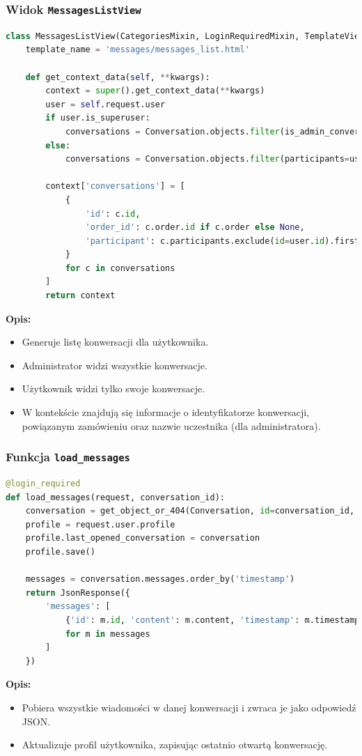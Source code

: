 \documentclass[12pt,a4paper,oneside]{article}
\theoremstyle{definition}
\numberwithin{equation}{section}
\begin{document}
\subsubsection{Widok \texttt{MessagesListView}}
\begin{lstlisting}[language=Python, caption=\texttt{MessagesListView}]
class MessagesListView(CategoriesMixin, LoginRequiredMixin, TemplateView):
    template_name = 'messages/messages_list.html'

    def get_context_data(self, **kwargs):
        context = super().get_context_data(**kwargs)
        user = self.request.user
        if user.is_superuser:
            conversations = Conversation.objects.filter(is_admin_conversation=False)
        else:
            conversations = Conversation.objects.filter(participants=user)

        context['conversations'] = [
            {
                'id': c.id,
                'order_id': c.order.id if c.order else None,
                'participant': c.participants.exclude(id=user.id).first().username if user.is_superuser else None
            }
            for c in conversations
        ]
        return context
\end{lstlisting}
\textbf{Opis:}
\begin{itemize}
    \item Generuje listę konwersacji dla użytkownika.
    \item Administrator widzi wszystkie konwersacje.
    \item Użytkownik widzi tylko swoje konwersacje.
    \item W kontekście znajdują się informacje o identyfikatorze konwersacji, powiązanym zamówieniu oraz nazwie uczestnika (dla administratora).
\end{itemize}




\subsubsection*{Funkcja \texttt{load\_messages}}
\begin{lstlisting}[language=Python, caption=Funkcja \texttt{load\_messages}]
@login_required
def load_messages(request, conversation_id):
    conversation = get_object_or_404(Conversation, id=conversation_id, participants=request.user)
    profile = request.user.profile
    profile.last_opened_conversation = conversation
    profile.save()

    messages = conversation.messages.order_by('timestamp')
    return JsonResponse({
        'messages': [
            {'id': m.id, 'content': m.content, 'timestamp': m.timestamp.strftime('%H:%M'), 'sender': m.sender.username}
            for m in messages
        ]
    })
\end{lstlisting}
\textbf{Opis:}
\begin{itemize}
    \item Pobiera wszystkie wiadomości w danej konwersacji i zwraca je jako odpowiedź JSON.
    \item Aktualizuje profil użytkownika, zapisując ostatnio otwartą konwersację.
\end{itemize}
\end{document}
